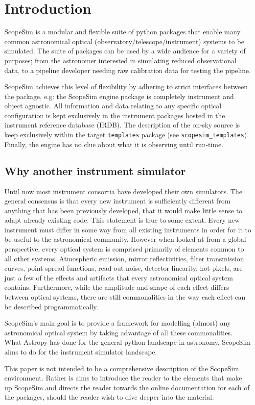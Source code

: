 

\section{Introduction%
  \label{introduction}%
}

ScopeSim is a modular and flexible suite of python packages that enable many common astronomical optical (observatory/telescope/instrument) systems to be simulated.
The suite of packages can be used by a wide audience for a variety of purposes; from the astronomer interested in simulating reduced observational data, to a pipeline developer needing raw calibration data for testing the pipeline.

ScopeSim achieves this level of flexibility by adhering to strict interfaces between the package, e.g: the ScopeSim engine package is completely instrument and object agnostic.
All information and data relating to any specific optical configuration is kept exclusively in the instrument packages hosted in the instrument reference database (IRDB).
The description of the on-sky source is keep exclusively within the target \texttt{templates} package (see \texttt{scopesim\_templates}).
Finally, the engine has no clue about what it is observing until run-time.


\subsection{Why another instrument simulator%
  \label{why-another-instrument-simulator}%
}

Until now most instrument consortia have developed their own simulators.
The general consensus is that every new instrument is sufficiently different from anything that has been previously developed, that it would make little sense to adapt already existing code.
This statement is true to some extent.
Every new instrument must differ in some way from all existing instruments in order for it to be useful to the astronomical community.
However when looked at from a global perspective, every optical system is comprised primarily of elements common to all other systems.
Atmospheric emission, mirror reflectivities, filter transmission curves, point spread functions, read-out noise, detector linearity, hot pixels, are just a few of the effects and artifacts that every astronomical optical system contains.
Furthermore, while the amplitude and shape of each effect differs between optical systems, there are still commonalities in the way each effect can be described programmatically.

ScopeSim's main goal is to provide a framework for modelling (almost) any astronomical optical system by taking advantage of all these commonalities.
What Astropy has done for the general python landscape in astronomy, ScopeSim aims to do for the instrument simulator landscape.

This paper is not intended to be a comprehensive description of the ScopeSim environment. Rather is aims to introduce the reader to the elements that make up ScopeSim and directs the reader towards the online documentation for each of the packages, should the reader wish to dive deeper into the material.

